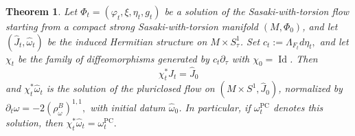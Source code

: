 \documentclass{article}
\newtheorem{thm}{Theorem}[section]
\theoremstyle{definition}
\numberwithin{equation}{section}
\begin{document}
\begin{thm}
\label{thm:SWT-pluriclosed}
Let $\Phi_t=(\varphi_t,\xi,\eta_t,g_t)$ be a solution of the
Sasaki-with-torsion flow starting from a compact strong
Sasaki-with-torsion manifold $(M, \Phi_0)$, and let
$(\widehat J_t,\widehat\omega_t)$ be the induced Hermitian structure
on $M\times S^1_{\tau}$. Set $
c_t:=\Lambda_{F_t}d\eta_t,$ 
and let $\chi_t$ be the family of diffeomorphisms generated by
$c_t\partial_\tau$ with $\chi_0=\operatorname{Id}$. Then
\[
\chi_t^*\widehat J_t=\widehat J_0
\]
and $\chi_t^*\widehat\omega_t$ is the solution of the pluriclosed flow
on $(M\times S^1,\widehat J_0)$, normalized by
$
\partial_t\omega
=
-2\left(\rho^B_\omega\right)^{1,1},
$
with initial datum $\widehat\omega_0$. In particular, if
$\omega_t^{\mathrm{PC}}$ denotes this solution, then
$
\chi_t^*\widehat\omega_t=\omega_t^{\mathrm{PC}}.
$
\end{thm}
\end{document}
